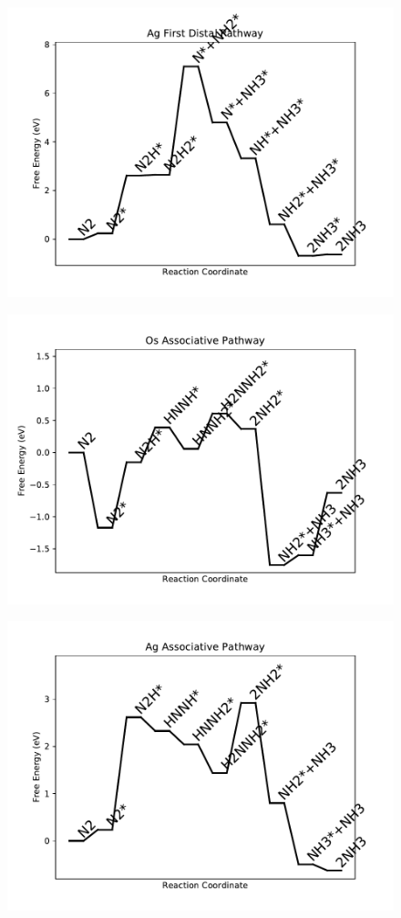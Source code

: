 \begin{figure}
\includegraphics[width=0.8\linewidth]{data/plots/Ag_distal_1.pdf}
\end{figure}

\begin{figure}
\includegraphics[width=0.8\linewidth]{data/plots/Os_associative.pdf}
\end{figure}

\begin{figure}
\includegraphics[width=0.8\linewidth]{data/plots/Ag_associative.pdf}
\end{figure}


